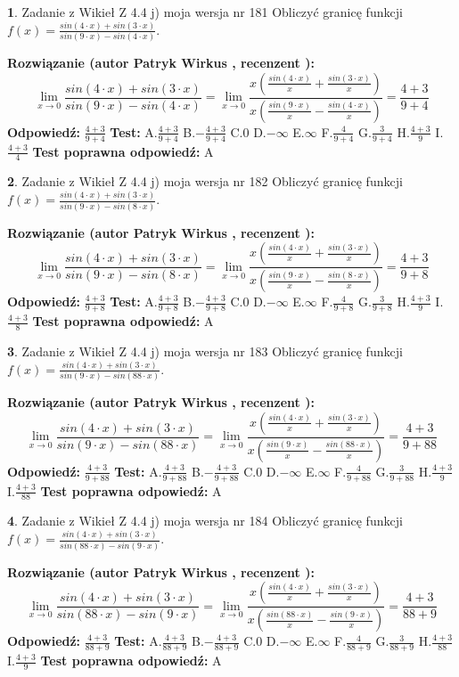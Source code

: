 \documentclass[12pt, a4paper]{article}
\theoremstyle{definition} %
\newtheorem{zad}{}
\newcommand{\zadStart}[1]{\begin{zad}#1\newline}
\newcommand{\zadStop}{\end{zad}}
\newcommand{\rozwStart}[2]{\noindent \textbf{Rozwiązanie (autor #1 , recenzent #2): }\newline}
\newcommand{\rozwStop}{\newline}
\newcommand{\odpStart}{\noindent \textbf{Odpowiedź:}\newline}
\newcommand{\odpStop}{\newline}
\newcommand{\testStart}{\noindent \textbf{Test:}\newline}
\newcommand{\testStop}{\newline}
\newcommand{\kluczStart}{\noindent \textbf{Test poprawna odpowiedź:}\newline}
\newcommand{\kluczStop}{\newline}
\begin{document}
\zadStart{Zadanie z Wikieł Z 4.4 j) moja wersja nr 181}
Obliczyć granicę funkcji $f(x)=\frac{sin(4\cdot x) +sin(3\cdot x)}{sin(9\cdot x) -sin(4\cdot x)}$.
\zadStop
\rozwStart{Patryk Wirkus}{}
$$\lim\limits_{x\to 0}\frac{sin(4\cdot x) +sin(3\cdot x)}{sin(9\cdot x) -sin(4\cdot x)}=\lim\limits_{x\to 0}\frac{x(\frac{sin(4\cdot x)}{x}+\frac{sin(3\cdot x)}{x})}{x(\frac{sin(9\cdot x)}{x}-\frac{sin(4\cdot x)}{x})}=\frac{4+3}{9+4}$$
\rozwStop
\odpStart
$\frac{4+3}{9+4}$
\odpStop
\testStart
A.$\frac{4+3}{9+4}$
B.$-\frac{4+3}{9+4}$
C.$0$
D.$-\infty$
E.$\infty$
F.$\frac{4}{9+4}$
G.$\frac{3}{9+4}$
H.$\frac{4+3}{9}$
I.$\frac{4+3}{4}$
\testStop
\kluczStart
A
\kluczStop



\zadStart{Zadanie z Wikieł Z 4.4 j) moja wersja nr 182}
Obliczyć granicę funkcji $f(x)=\frac{sin(4\cdot x) +sin(3\cdot x)}{sin(9\cdot x) -sin(8\cdot x)}$.
\zadStop
\rozwStart{Patryk Wirkus}{}
$$\lim\limits_{x\to 0}\frac{sin(4\cdot x) +sin(3\cdot x)}{sin(9\cdot x) -sin(8\cdot x)}=\lim\limits_{x\to 0}\frac{x(\frac{sin(4\cdot x)}{x}+\frac{sin(3\cdot x)}{x})}{x(\frac{sin(9\cdot x)}{x}-\frac{sin(8\cdot x)}{x})}=\frac{4+3}{9+8}$$
\rozwStop
\odpStart
$\frac{4+3}{9+8}$
\odpStop
\testStart
A.$\frac{4+3}{9+8}$
B.$-\frac{4+3}{9+8}$
C.$0$
D.$-\infty$
E.$\infty$
F.$\frac{4}{9+8}$
G.$\frac{3}{9+8}$
H.$\frac{4+3}{9}$
I.$\frac{4+3}{8}$
\testStop
\kluczStart
A
\kluczStop



\zadStart{Zadanie z Wikieł Z 4.4 j) moja wersja nr 183}
Obliczyć granicę funkcji $f(x)=\frac{sin(4\cdot x) +sin(3\cdot x)}{sin(9\cdot x) -sin(88\cdot x)}$.
\zadStop
\rozwStart{Patryk Wirkus}{}
$$\lim\limits_{x\to 0}\frac{sin(4\cdot x) +sin(3\cdot x)}{sin(9\cdot x) -sin(88\cdot x)}=\lim\limits_{x\to 0}\frac{x(\frac{sin(4\cdot x)}{x}+\frac{sin(3\cdot x)}{x})}{x(\frac{sin(9\cdot x)}{x}-\frac{sin(88\cdot x)}{x})}=\frac{4+3}{9+88}$$
\rozwStop
\odpStart
$\frac{4+3}{9+88}$
\odpStop
\testStart
A.$\frac{4+3}{9+88}$
B.$-\frac{4+3}{9+88}$
C.$0$
D.$-\infty$
E.$\infty$
F.$\frac{4}{9+88}$
G.$\frac{3}{9+88}$
H.$\frac{4+3}{9}$
I.$\frac{4+3}{88}$
\testStop
\kluczStart
A
\kluczStop



\zadStart{Zadanie z Wikieł Z 4.4 j) moja wersja nr 184}
Obliczyć granicę funkcji $f(x)=\frac{sin(4\cdot x) +sin(3\cdot x)}{sin(88\cdot x) -sin(9\cdot x)}$.
\zadStop
\rozwStart{Patryk Wirkus}{}
$$\lim\limits_{x\to 0}\frac{sin(4\cdot x) +sin(3\cdot x)}{sin(88\cdot x) -sin(9\cdot x)}=\lim\limits_{x\to 0}\frac{x(\frac{sin(4\cdot x)}{x}+\frac{sin(3\cdot x)}{x})}{x(\frac{sin(88\cdot x)}{x}-\frac{sin(9\cdot x)}{x})}=\frac{4+3}{88+9}$$
\rozwStop
\odpStart
$\frac{4+3}{88+9}$
\odpStop
\testStart
A.$\frac{4+3}{88+9}$
B.$-\frac{4+3}{88+9}$
C.$0$
D.$-\infty$
E.$\infty$
F.$\frac{4}{88+9}$
G.$\frac{3}{88+9}$
H.$\frac{4+3}{88}$
I.$\frac{4+3}{9}$
\testStop
\kluczStart
A
\kluczStop
\end{document}
